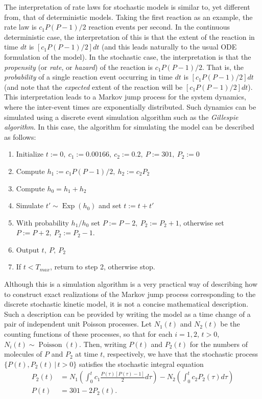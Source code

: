 The interpretation of rate laws for stochastic models is similar
to, yet different from, that of deterministic models. Taking the
first reaction as an example, the rate law is $c_1P(P-1)/2$ reaction
events per second. In the continuous deterministic case, the
interpretation of this is that the extent of the reaction in time
$dt$ is $[c_1P(P-1)/2]dt$ (and this leads naturally to the usual ODE
formulation of the model). In the stochastic case, the
interpretation is that the \emph{propensity} (or \emph{rate}, or
\emph{hazard}) of the reaction is $c_1P(P-1)/2$. That is, the
\emph{probability} of a single reaction event occurring in time
$dt$ is $[c_1P(P-1)/2]dt$ (and note that the \emph{expected} extent of
the reaction will be $[c_1P(P-1)/2]dt$). This interpretation leads to a Markov
jump process for the system dynamics, where the inter-event times
are exponentially distributed. Such dynamics can be simulated
using a discrete event simulation algorithm such as the
\emph{Gillespie algorithm}. In this case, the algorithm for
simulating the model can be described as follows:
\begin{enumerate}
\item Initialize $t:=0,\ c_1:=0.00166,\ c_2:=0.2,\ P:=301,\ P_2:=0$
\item Compute $h_1:=c_1P(P-1)/2,\ h_2:=c_2P_2$
\item Compute $h_0=h_1+h_2$
\item Simulate $t'\sim \operatorname{Exp}(h_0)$ and set $t:=t+t'$
\item With probability $h_1/h_0$ set $P:=P-2,\ P_2:=P_2+1$,
otherwise set $P:=P+2,\ P_2:=P_2-1$.
\item Output $t,\ P,\ P_2$
\item If $t<T_{max}$, return to step 2, otherwise stop.
\end{enumerate}
Although this is a simulation algorithm is a very practical way of
describing how to construct exact realizations of the Markov jump
process corresponding to the discrete stochastic kinetic model, it
is not a concise mathematical description. Such a description can
be provided by writing the model as a time change of a pair of
independent unit Poisson processes. Let $N_1(t)$ and $N_2(t)$ be
the counting functions of these processes, so that for each
$i=1,2$, $t>0$, $N_i(t)\sim \operatorname{Poisson}(t)$. Then,
writing $P(t)$ and $P_2(t)$ for the numbers of molecules of $P$
and $P_2$ at time $t$, respectively, we have that the stochastic process
$\{P(t),P_2(t)\,|\,t>0\}$ satisfies the stochastic integral equation
\begin{align*}
P_2(t) &= N_1\left(\int_0^t
c_1\frac{P(\tau)[P(\tau)-1]}{2}d\tau\right) - N_2\left(\int_0^t
c_2 P_2(\tau)d\tau\right) \\
P(t) &= 301 - 2P_2(t).
\end{align*}
